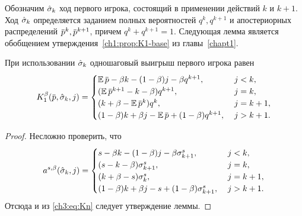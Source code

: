 {Обозначим $\hat{\sigma}_k$ ход первого игрока, состоящий в применении действий $k$ и $k+1$.
Ход $\hat{\sigma}_k$ определяется заданием полных вероятностей $q^k, q^{k+1}$ и апостериорных распределений $\p^k, \p^{k+1}$, причем $q^k + q^{k+1} = 1$.
Следующая лемма является обобщением утверждения~\ref{ch1:prop:K1-base} из главы~\ref{chapt1}.
\begin{lemma}
  \label{ch3:lower-bound:lemma:stage-payoff}
  При использовании $\hat{\sigma}_k$ одношаговый выигрыш первого игрока равен
  \begin{equation*}
    \K[1](\p, \sigmak_k, j) = \begin{cases}
      \E \p - \beta k - (1-\beta) j - \beta q^{k+1}, &\; j < k, \\
      (\E \p^{k+1} - k - \beta) q^{k+1}, &\; j = k, \\
      (k + \beta - \E \p^k) q^k, &\; j = k+1, \\
      (1-\beta) k + \beta j - \E \p + (1-\beta) q^{k+1}, &\; j > k + 1.
    \end{cases}
  \end{equation*}
\end{lemma}
\begin{proof}
  Несложно проверить, что
  \begin{equation*}
    a^{s,\beta}(\hat{\sigma}_k, j) = \begin{cases}
      s - \beta k - (1-\beta) j - \beta \sigma^s_{k+1}, &\; j < k,\\
      (s - k - \beta) \sigma^s_{k+1}, &\; j = k,\\
      (k + \beta - s) \sigma^s_k, &\; j = k+1,\\
      (1-\beta) k + \beta j - s + (1-\beta) \sigma^s_{k+1}, &\; j > k + 1.
    \end{cases}
  \end{equation*}
  Отсюда и из \eqref{ch3:eq:Kn} следует утверждение леммы.
\end{proof}

}
